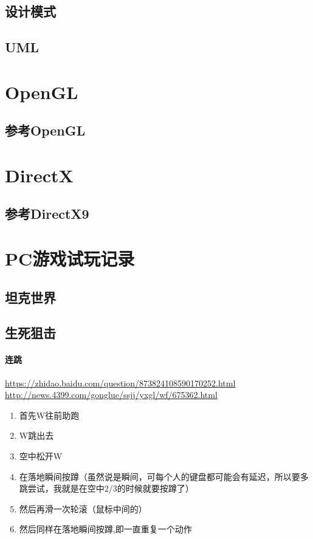 \documentclass[UTF8,a4paper,8pt]{ctexart}
\begin{document}
	\subsection{设计模式}
	\subsection{UML}

\newpage
\section{OpenGL}
	\subsection{参考OpenGL}
	
\newpage
\section{DirectX}
	\subsection{参考DirectX9}
	
\newpage
\section{PC游戏试玩记录}
	\subsection{坦克世界}
	
	\subsection{生死狙击}
		\paragraph{连跳}
			\url{https://zhidao.baidu.com/question/873824108590170252.html}
			\url{http://news.4399.com/gonglue/ssjj/yxgl/wf/675362.html}
			\begin{enumerate}
				\item 首先W往前助跑
				\item W跳出去
				\item 空中松开W
				\item 在落地瞬间按蹲（虽然说是瞬间，可每个人的键盘都可能会有延迟，所以要多跳尝试，我就是在空中2/3的时候就要按蹲了）
				\item 然后再滑一次轮滚（鼠标中间的）
				\item 然后同样在落地瞬间按蹲,即一直重复一个动作
			\end{enumerate}
\end{document}
